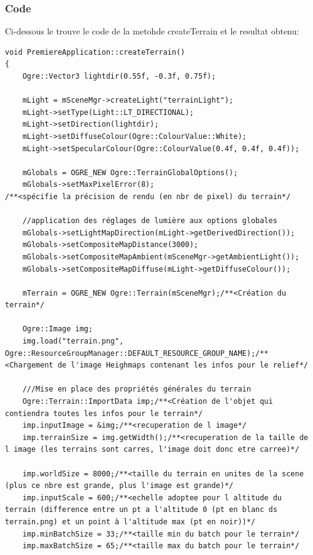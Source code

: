 \subsubsection{Code}

Ci-dessous le trouve le code de la metohde createTerrain et le resultat obtenu:

\begin{lstlisting}[caption={createTerrain}]
void PremiereApplication::createTerrain()
{    
    Ogre::Vector3 lightdir(0.55f, -0.3f, 0.75f);
    
    mLight = mSceneMgr->createLight("terrainLight");
    mLight->setType(Light::LT_DIRECTIONAL);
    mLight->setDirection(lightdir);
    mLight->setDiffuseColour(Ogre::ColourValue::White);
    mLight->setSpecularColour(Ogre::ColourValue(0.4f, 0.4f, 0.4f)); 
    
    mGlobals = OGRE_NEW Ogre::TerrainGlobalOptions();
    mGlobals->setMaxPixelError(8);                                      /**<spécifie la précision de rendu (en nbr de pixel) du terrain*/    
    
    //application des réglages de lumière aux options globales
    mGlobals->setLightMapDirection(mLight->getDerivedDirection());
    mGlobals->setCompositeMapDistance(3000);
    mGlobals->setCompositeMapAmbient(mSceneMgr->getAmbientLight());
    mGlobals->setCompositeMapDiffuse(mLight->getDiffuseColour());    
    
    mTerrain = OGRE_NEW Ogre::Terrain(mSceneMgr);/**<Création du terrain*/
    
    Ogre::Image img;
    img.load("terrain.png", Ogre::ResourceGroupManager::DEFAULT_RESOURCE_GROUP_NAME);/**<Chargement de l'image Heighmaps contenant les infos pour le relief*/
    
    ///Mise en place des propriétés générales du terrain
    Ogre::Terrain::ImportData imp;/**<Création de l'objet qui contiendra toutes les infos pour le terrain*/
    imp.inputImage = &img;/**<recuperation de l image*/
    imp.terrainSize = img.getWidth();/**<recuperation de la taille de l image (les terrains sont carres, l'image doit donc etre carree)*/

    imp.worldSize = 8000;/**<taille du terrain en unites de la scene (plus ce nbre est grande, plus l'image est grande)*/
    imp.inputScale = 600;/**<echelle adoptee pour l altitude du terrain (difference entre un pt a l'altitude 0 (pt en blanc ds terrain.png) et un point à l'altitude max (pt en noir))*/
    imp.minBatchSize = 33;/**<taille min du batch pour le terrain*/
    imp.maxBatchSize = 65;/**<taille max du batch pour le terrain*/
    

\end{lstlisting}
